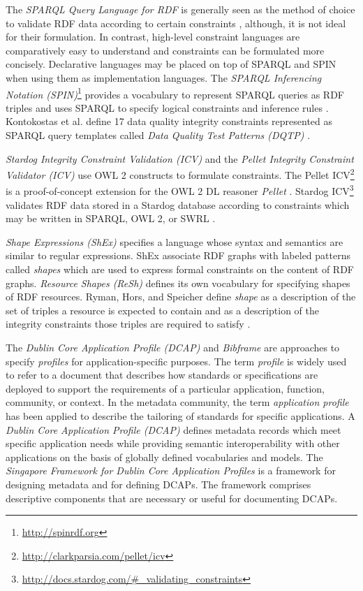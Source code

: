 \documentclass[a4paper,fontsize=11pt]{scrartcl}
\begin{document}
The \emph{SPARQL Query Language for RDF} \cite{W3C-SPARQL1.1-Query-Language-2013} is generally seen as the method of choice to validate RDF data according to certain constraints \cite{Fuerber2010}, 
although, it is not ideal for their formulation. 
In contrast, high-level constraint languages are comparatively easy to understand and constraints can be formulated more concisely.
Declarative languages may be placed on top of SPARQL and SPIN when using them as implementation languages. The \emph{SPARQL Inferencing Notation (SPIN)}\footnote{\url{http://spinrdf.org}} \cite{W3C-SPIN-2011} provides a vocabulary to represent SPARQL queries as RDF triples
and uses SPARQL to specify logical constraints and inference rules \cite{Fuerber2010}. Kontokostas et al. define 17 data quality integrity constraints represented as SPARQL query templates called \emph{Data Quality Test Patterns (DQTP)} \cite{Kontokostas2014}. 

\emph{Stardog Integrity Constraint Validation (ICV)} and the \emph{Pellet Integrity Constraint Validator (ICV)} use OWL 2 constructs to formulate constraints. The Pellet ICV\footnote{\url{http://clarkparsia.com/pellet/icv}} is a proof-of-concept extension for the OWL 2 DL reasoner \emph{Pellet} \cite{sirin2007pellet}. Stardog ICV\footnote{\url{http://docs.stardog.com/#_validating_constraints}} validates RDF data stored in a Stardog database according to constraints which may be written in SPARQL, OWL 2, or SWRL \cite{Horrocks04}. 

\emph{Shape Expressions (ShEx)} \cite{W3C-ShEx-Primer-2014,W3C-ShEx-Definition-2014,Prud'hommeaux-2014,Boneva-2014} specifies a language whose syntax and semantics are similar to regular expressions. ShEx associate RDF graphs with labeled patterns called \emph{shapes} which are used to express formal constraints on the content of RDF graphs. \emph{Resource Shapes (ReSh)} \cite{W3C-ReSh-2014} defines its own vocabulary for specifying shapes of RDF resources. Ryman, Hors, and Speicher define \emph{shape} as a description of the set of triples a resource is expected to contain and as a description of the integrity constraints those triples are required to satisfy \cite{Ryman2013}. 

The \emph{Dublin Core Application Profile (DCAP)} and \emph{Bibframe} are approaches to specify \emph{profiles} for application-specific purposes. The term \emph{profile} is widely used to refer to a document that describes how standards or specifications are deployed to support the requirements of a particular application, function, community, or context. In the metadata community, the term \emph{application profile} has been applied to describe the tailoring of standards for specific applications. A \emph{Dublin Core Application Profile (DCAP)} \cite{DCMI-DCAP-2009} defines metadata records which meet specific application needs while providing semantic interoperability with other applications on the basis of globally defined vocabularies and models. The \emph{Singapore Framework for Dublin Core Application Profiles} \cite{DCMI-Singapore-2008} is a framework for designing metadata and for defining DCAPs. The framework comprises descriptive components that are necessary or useful for documenting DCAPs.
\end{document}
